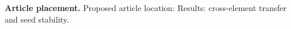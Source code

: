 \textbf{Article placement.} Proposed article location: Results: cross-element transfer and seed stability.
